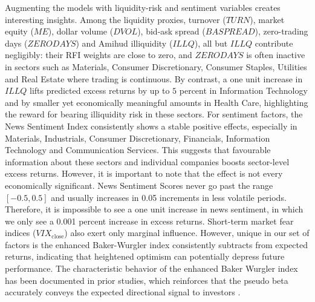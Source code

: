 Augmenting the models with liquidity-risk and sentiment variables creates interesting insights. Among the liquidity proxies, turnover ($TURN$), market equity ($ME$), dollar volume ($DVOL$), bid-ask spread ($BASPREAD$), zero-trading days ($ZERODAYS$) and Amihud illiquidity ($ILLQ$), all but $ILLQ$ contribute negligibly: their RFI weights are close to zero, and $ZERODAYS$ is often inactive in sectors such as Materials, Consumer Discretionary, Consumer Staples, Utilities and Real Estate where trading is continuous. By contrast, a one unit increase in $ILLQ$ lifts predicted excess returns by up to $5$ percent in Information Technology and by smaller yet economically meaningful amounts in Health Care, highlighting the reward for bearing illiquidity risk in these sectors. For sentiment factors, the News Sentiment Index consistently shows a stable positive effects, especially in Materials, Industrials, Consumer Discretionary, Financials, Information Technology and Communication Services. This suggests that favourable information about these sectors and individual companies boosts sector-level excess returns. However, it is important to note that the effect is not every economically significant. News Sentiment Scores never go past the range $[-0.5, 0.5]$ and usually increases in 0.05 increments in less volatile periods. Therefore, it is impossible to see a one unit increase in news sentiment, in which we only see a 0.001 percent increase in excess returns. Short-term market fear indices ($VIX_{\text{close}}$) also exert only marginal influence. However, unique in our set of factors is the  enhanced Baker-Wurgler index consistently subtracts from expected returns, indicating that heightened optimism can potentially depress future performance. The characteristic behavior of the enhanced Baker Wurgler index has been documented in prior studies, which reinforces that the pseudo beta accurately conveys the expected directional signal to investors \cite{ung_2023,wurgler_2007}.


